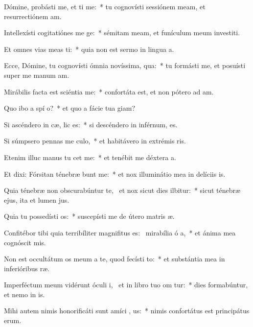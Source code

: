 \item Dómine, probásti me, et ti me:~* tu cognovísti sessiónem meam, et resurrectiónem am.
\item Intellexísti cogitatiónes me  ge:~* sémitam meam, et funículum meum investiti.
\item Et omnes vias meas ti:~* quia non est sermo in lingua a.
\item Ecce, Dómine, tu cognovísti ómnia novíssima,  qua:~* tu formásti me, et posuísti super me manum am.
\item Mirábilis facta est sciéntia   me:~* confortáta est, et non pótero ad am.
\item Quo ibo a spí o?~* et quo a fácie tua giam?
\item Si ascéndero in cæ,  lic es:~* si descéndero in inférnum, es.
\item Si súmpsero pennas me culo,~* et habitávero in extrémis ris.
\item Etenim illuc manus tu cet me:~* et tenébit me déxtera a.
\item Et dixi: Fórsitan ténebræ bunt me:~* et nox illuminátio mea in delíciis is.
\item Quia ténebræ non obscurabúntur  te,~\pscross{} et nox sicut dies ilbitur:~* sicut ténebræ ejus, ita et lumen jus.
\item Quia tu possedísti  os:~* suscepísti me de útero matris æ.
\item Confitébor tibi quia terribíliter magnifitus es:~\pscross{} mirabília ó a,~* et ánima mea cognóscit mis.
\item Non est occultátum os meum a te, quod fecísti  to:~* et substántia mea in inferióribus ræ.
\item Imperféctum meum vidérunt óculi i,~\pscross{} et in libro tuo om tur:~* dies formabúntur, et nemo in is.
\item Mihi autem nimis honorificáti sunt amíci , us:~* nimis confortátus est principátus erum.
